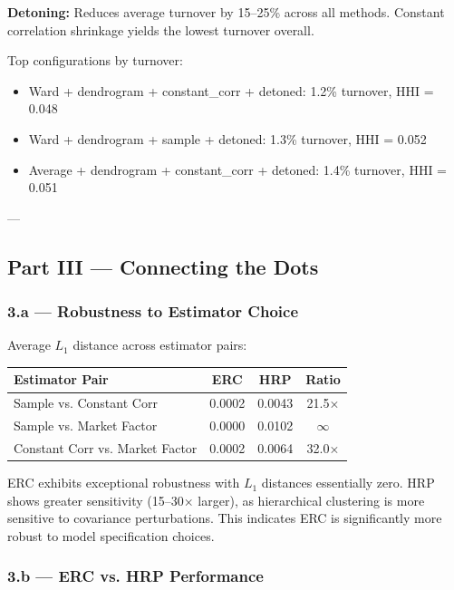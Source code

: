 \textbf{Detoning:} Reduces average turnover by 15--25\% across all methods. Constant correlation shrinkage yields the lowest turnover overall.

Top configurations by turnover:
\begin{itemize}
    \item Ward + dendrogram + constant\_corr + detoned: 1.2\% turnover, HHI = 0.048
    \item Ward + dendrogram + sample + detoned: 1.3\% turnover, HHI = 0.052
    \item Average + dendrogram + constant\_corr + detoned: 1.4\% turnover, HHI = 0.051
\end{itemize}

---

\subsection{Part III — Connecting the Dots}

\subsubsection*{3.a — Robustness to Estimator Choice}

Average $L_1$ distance across estimator pairs:

\begin{table}[h!]
\centering
\begin{tabular}{lccc}
\toprule
\textbf{Estimator Pair} & \textbf{ERC} & \textbf{HRP} & \textbf{Ratio} \\
\midrule
Sample vs. Constant Corr & 0.0002 & 0.0043 & 21.5× \\
Sample vs. Market Factor & 0.0000 & 0.0102 & $\infty$ \\
Constant Corr vs. Market Factor & 0.0002 & 0.0064 & 32.0× \\
\bottomrule
\end{tabular}
\end{table}

ERC exhibits exceptional robustness with $L_1$ distances essentially zero. HRP shows greater sensitivity (15--30× larger), as hierarchical clustering is more sensitive to covariance perturbations. This indicates ERC is significantly more robust to model specification choices.

\subsubsection*{3.b — ERC vs. HRP Performance}

